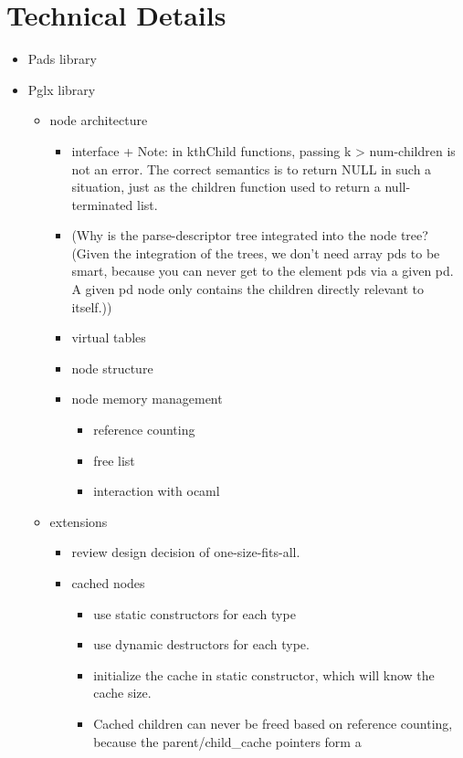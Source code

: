 \documentclass{article}
\begin{document}
\section{Technical Details}
\begin{itemize}
\item Pads library
\item Pglx library
  \begin{itemize}
  \item node architecture
    \begin{itemize}
    \item interface 
      + Note: in kthChild functions, passing k > num-children is not an
      error. The correct semantics is to return NULL in such a
      situation, just as the children function used to return a
      null-terminated list.
    \item (Why is the parse-descriptor tree integrated into the node
      tree?  (Given the integration of the trees, we don't need array
      pds to be smart, because you can never get to the element pds
      via a given pd. A given pd node only contains the children
      directly relevant to itself.))
    \item virtual tables
    \item node structure
    \item node memory management
      \begin{itemize}
      \item reference counting
      \item free list
      \item interaction with ocaml
      \end{itemize}
    \end{itemize}
  \item extensions
    \begin{itemize}
    \item review design decision of one-size-fits-all.
    \item cached nodes
      \begin{itemize}
      \item use static constructors for each type
      \item use dynamic destructors for each type.
      \item initialize the cache in static constructor, which will know
        the cache size.
      \item Cached children can never be freed based on reference
        counting, because the parent/child\_cache pointers form a

\end{itemize}
\end{itemize}
\end{itemize}
\end{itemize}
\end{document}
